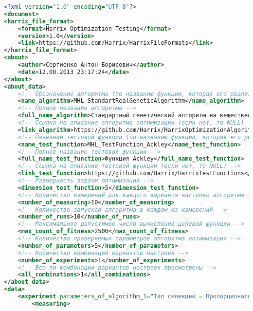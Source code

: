 \documentclass[a4paper,12pt]{article}
\begin{document}
\begin{lstlisting}[label=Example01, language=xml ,caption=Пример части файла Harrix Optimization Testing]
<?xml version="1.0" encoding="UTF-8"?>
<document>
<harrix_file_format>
	<format>Harrix Optimization Testing</format>
	<version>1.0</version>
	<link>https://github.com/Harrix/HarrixFileFormats</link>
</harrix_file_format>
<about>
	<author>Сергиенко Антон Борисович</author>
	<date>12.08.2013 23:17:24</date>
</about>
<about_data>
	<!-- Обозначение алгоритма (по названию функции, которая его реализует) -->
	<name_algorithm>MHL_StandartRealGeneticAlgorithm</name_algorithm>
	<!-- Полное название алгоритма -->
	<full_name_algorithm>Стандартный генетический алгоритм на вещественных строках</full_name_algorithm>
	<!-- Ссылка на описание алгоритма оптимизации (если нет, то NULL) -->
	<link_algorithm>https://github.com/Harrix/HarrixOptimizationAlgorithms</link_algorithm>
	<!-- Название тестовой функции (по названию функции, которая его реализует) -->
	<name_test_function>MHL_TestFunction_Ackley</name_test_function>
	<!-- Полное название тестовой функции -->
	<full_name_test_function>Функция Ackley</full_name_test_function>
	<!-- Ссылка на описание тестовой функции (если нет, то NULL) -->
	<link_test_function>https://github.com/Harrix/HarrixTestFunctions</link_test_function>
	<!-- Размерность задачи оптимизации -->
	<dimension_test_function>5</dimension_test_function>
	<!-- Количество измерений для каждого варианта настроек алгоритма (сколько точек получим) -->
	<number_of_measuring>10</number_of_measuring>
	<!-- Количество запусков алгоритма в каждом из измерений -->
	<number_of_runs>10</number_of_runs>
	<!-- Максимальное допустимое число вычислений целевой функции -->
	<max_count_of_fitness>2500</max_count_of_fitness>
	<!-- Количество проверяемых параметров алгоритма оптимизации -->
	<number_of_parameters>5</number_of_parameters>
	<!-- Количество комбинаций вариантов настроек -->
	<number_of_experiments>1</number_of_experiments>
	<!-- Все ли комбинации вариантов настроек просмотрены -->
	<all_combinations>1</all_combinations>
</about_data>
<data>
	<experiment parameters_of_algorithm_1="Тип селекции = Пропорциональная селекция" parameters_of_algorithm_2="Тип скрещивания = Одноточечное скрещивание" parameters_of_algorithm_3="Тип мутации = Слабая мутация" parameters_of_algorithm_4="Тип формирования нового поколения = Только потомки" parameters_of_algorithm_5="Тип преобразования задачи вещественной оптимизации в задачу бинарной оптимизации = Стандартное представление целого числа - номер узла в сетке дискретизации">
		<measuring>

\end{lstlisting}
\end{document}
